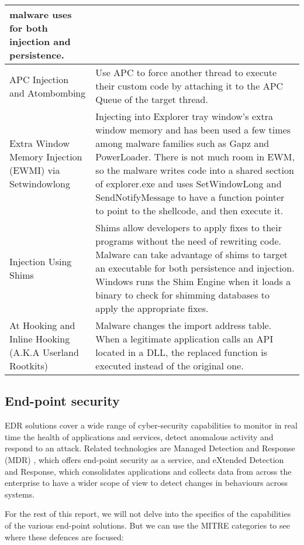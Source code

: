 \begin{table}[!ht]
\begin{tabular}{ |p{3.5cm}||p{10.5cm}|  }
               malware uses for both injection and persistence. \\
  \hline
  APC Injection and Atombombing
             & Use APC to force another thread to execute their custom code by attaching it to the APC
               Queue of the target thread. \\
  \hline
  Extra Window Memory Injection (EWMI) via Setwindowlong
             & Injecting into Explorer tray window’s extra window memory and has been used a few times
               among malware families such as Gapz and PowerLoader. There is not much room in EWM, so the
               malware writes code into a shared section of explorer.exe and uses SetWindowLong and
               SendNotifyMessage to have a function pointer to point to the shellcode, and then execute it. \\
  \hline
  Injection Using Shims
             & Shims allow developers to apply fixes to their programs without the need of rewriting code.
               Malware can take advantage of shims to target an executable for both persistence and injection.
               Windows runs the Shim Engine when it loads a binary to check for shimming databases
               to apply the appropriate fixes. \\
  \hline
  At Hooking and Inline Hooking (A.K.A Userland Rootkits)
            & Malware changes the import address table. When a legitimate application calls an API located
              in a DLL, the replaced function is executed instead of the original one. \\
  \iffalse
\fi
  \hline
\end{tabular}
\label{table: ProcessInjectionTechniques}
\end{table}


\subsection{End-point security}

EDR solutions cover a wide range of cyber-security capabilities to monitor in real time the health of applications
and services, detect anomalous activity and respond to an attack.
Related technologies are Managed Detection and Response (MDR) \autocite{Hayes:2023}, which offers end-point security as a service, and
eXtended Detection and Response, which consolidates applications and collects data from across the enterprise to
have a wider scope of view to detect changes in behaviours across systems.

For the rest of this report, we will not delve into the specifics of the capabilities of the various end-point solutions.
But we can use the MITRE categories to see where these defences are focused:


